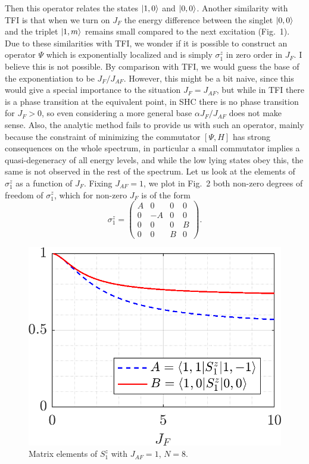 \documentclass[12pt]{report}
\newcommand{\s}{\sigma}
\begin{document}
Then this operator relates the states $\ket{1,0}$ and $\ket{0,0}$. Another similarity with TFI is that when we turn on $J_F$ the energy difference between the singlet $\ket{0,0}$ and the triplet $\ket{1,m}$ remains small compared to the next excitation (Fig.~1). Due to these similarities with TFI, we wonder if it is possible to construct an operator $\Psi$ which is exponentially localized and is simply $\s_1^z$ in zero order in $J_F$. I believe this is not possible. By comparison with TFI, we would guess the base of the exponentiation to be $J_F/J_{AF}$. However, this might be a bit naive, since this would give a special importance to the situation $J_F=J_{AF}$, but while in TFI there is a phase transition at the equivalent point, in SHC there is no phase transition for $J_F>0$, so even considering a more general base $\alpha J_F/J_{AF}$ does not make sense. Also, the analytic method fails to provide us with such an operator, mainly because the constraint of minimizing the commutator $[\Psi,H]$ has strong  consequences on the whole spectrum, in particular a small commutator implies a quasi-degeneracy of all energy levels, and while the low lying states obey this, the same is not observed in the rest of the spectrum. Let us look at the elements of $\s_1^z$ as a function of $J_F$. Fixing $J_{AF} = 1$, we plot in Fig.~2 both non-zero degrees of freedom of $\s_1^z$, which for non-zero $J_F$ is of the form
%
\begin{equation}
\s_1^z =
\left(\begin{matrix}
A & 0 & 0 & 0\\
0 & -A & 0 & 0\\
0 & 0 & 0 & B\\
0 & 0 & B & 0
\end{matrix}\right).
\end{equation}
%
%
\begin{figure}
\centering
\includegraphics{Figures/Fig2.png}
\caption{Matrix elements of $S_1^z$ with $J_{AF} = 1$, $N= 8$.}
\end{figure}
\end{document}
